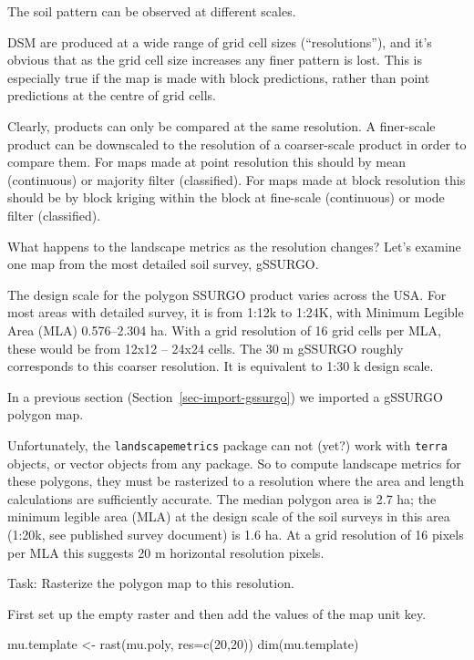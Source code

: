\documentclass[
  letterpaper,
  DIV=11,
  numbers=noendperiod]{scrartcl}
\newenvironment{Shaded}{\begin{snugshade}}{\end{snugshade}}
\newcommand{\AttributeTok}[1]{\textcolor[rgb]{0.40,0.45,0.13}{#1}}
\newcommand{\DecValTok}[1]{\textcolor[rgb]{0.68,0.00,0.00}{#1}}
\newcommand{\FunctionTok}[1]{\textcolor[rgb]{0.28,0.35,0.67}{#1}}
\newcommand{\NormalTok}[1]{\textcolor[rgb]{0.00,0.23,0.31}{#1}}
\newcommand{\OtherTok}[1]{\textcolor[rgb]{0.00,0.23,0.31}{#1}}
\begin{document}
The soil pattern can be observed at different scales.

DSM are produced at a wide range of grid cell sizes (``resolutions''),
and it's obvious that as the grid cell size increases any finer pattern
is lost. This is especially true if the map is made with block
predictions, rather than point predictions at the centre of grid cells.

Clearly, products can only be compared at the same resolution. A
finer-scale product can be downscaled to the resolution of a
coarser-scale product in order to compare them. For maps made at point
resolution this should by mean (continuous) or majority filter
(classified). For maps made at block resolution this should be by block
kriging within the block at fine-scale (continuous) or mode filter
(classified).

What happens to the landscape metrics as the resolution changes? Let's
examine one map from the most detailed soil survey, gSSURGO.

The design scale for the polygon SSURGO product varies across the USA.
For most areas with detailed survey, it is from 1:12k to 1:24K, with
Minimum Legible Area (MLA) 0.576--2.304 ha. With a grid resolution of 16
grid cells per MLA, these would be from 12x12 -- 24x24 cells. The 30 m
gSSURGO roughly corresponds to this coarser resolution. It is equivalent
to 1:30 k design scale.

In a previous section (Section~\ref{sec-import-gssurgo}) we imported a
gSSURGO polygon map.

Unfortunately, the \texttt{landscapemetrics} package can not (yet?) work
with \texttt{terra} objects, or vector objects from any package. So to
compute landscape metrics for these polygons, they must be rasterized to
a resolution where the area and length calculations are sufficiently
accurate. The median polygon area is 2.7 ha; the minimum legible area
(MLA) at the design scale of the soil surveys in this area (1:20k, see
published survey document) is 1.6 ha. At a grid resolution of 16 pixels
per MLA this suggests 20 m horizontal resolution pixels.

Task: Rasterize the polygon map to this resolution.

First set up the empty raster and then add the values of the map unit
key.

\begin{Shaded}
\begin{Highlighting}[]
\NormalTok{mu.template }\OtherTok{\textless{}{-}} \FunctionTok{rast}\NormalTok{(mu.poly, }\AttributeTok{res=}\FunctionTok{c}\NormalTok{(}\DecValTok{20}\NormalTok{,}\DecValTok{20}\NormalTok{))}
\FunctionTok{dim}\NormalTok{(mu.template)}
\end{Highlighting}
\end{Shaded}
\end{document}
